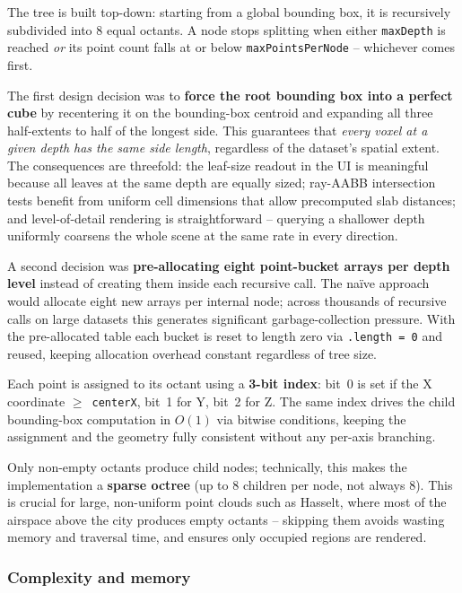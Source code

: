 \documentclass[12pt,a4paper]{article}
\begin{document}
The tree is built top-down: starting from a global bounding box, it is
recursively subdivided into 8 equal octants. A node stops splitting when
either \texttt{maxDepth} is reached \emph{or} its point count falls at or
below \texttt{maxPointsPerNode} -- whichever comes first.

The first design decision was to \textbf{force the root bounding box into a
perfect cube} by recentering it on the bounding-box centroid and expanding
all three half-extents to half of the longest side. This guarantees that
\emph{every voxel at a given depth has the same side length}, regardless of
the dataset's spatial extent. The consequences are threefold: the leaf-size
readout in the UI is meaningful because all leaves at the same depth are
equally sized; ray-AABB intersection tests benefit from uniform cell
dimensions that allow precomputed slab distances; and level-of-detail
rendering is straightforward -- querying a shallower depth uniformly
coarsens the whole scene at the same rate in every direction.

A second decision was \textbf{pre-allocating eight point-bucket arrays per
depth level} instead of creating them inside each recursive call. The na\"ive
approach would allocate eight new arrays per internal node; across thousands
of recursive calls on large datasets this generates significant
garbage-collection pressure. With the pre-allocated table each bucket is
reset to length zero via \texttt{.length = 0} and reused, keeping
allocation overhead constant regardless of tree size.

Each point is assigned to its octant using a \textbf{3-bit index}: bit~0
is set if the X coordinate $\geq$~\texttt{centerX}, bit~1 for Y, bit~2 for Z.
The same index drives the child bounding-box computation in $O(1)$ via bitwise
conditions, keeping the assignment and the geometry fully consistent without any
per-axis branching.

Only non-empty octants produce child nodes; technically, this makes the
implementation a \textbf{sparse octree} (up to 8 children per node, not
always 8). This is crucial for large, non-uniform point clouds such as
Hasselt, where most of the airspace above the city produces empty octants
-- skipping them avoids wasting memory and traversal time, and ensures only
occupied regions are rendered.

\subsubsection*{Complexity and memory}
\end{document}
